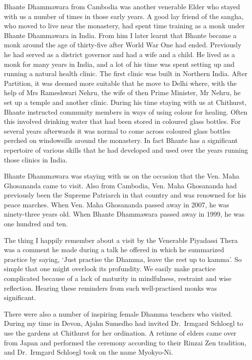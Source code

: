 \enlargethispage{\baselineskip}

Bhante Dhammawara\cite{dhammawara} from Cambodia was another venerable Elder who
stayed with us a number of times in those early years. A good lay friend
of the sangha, who moved to live near the monastery, had spent time
training as a monk under Bhante Dhammawara in India. From him I later
learnt that Bhante became a monk around the age of thirty-five after
World War One had ended. Previously he had served as a district governor
and had a wife and a child. He lived as a monk for many years in India,
and a lot of his time was spent setting up and running a natural health
clinic. The first clinic was built in Northern India. After Partition\cite{partition},
it was deemed more suitable that he move to Delhi where, with
the help of Mrs Rameshwari Nehru\cite{nehru}, the wife of then
Prime Minister, Mr Nehru, he set up a temple and another
clinic. During his time staying with us at Chithurst, Bhante instructed
community members in ways of using colour for healing. Often this
involved drinking water that had been stored in coloured glass bottles.
For several years afterwards it was normal to come across coloured glass
bottles perched on windowsills around the monastery. In fact Bhante has
a significant repertoire of various skills that he had developed and
used over the years running those clinics in India.

Bhante Dhammawara was staying with us on the occasion that the
Ven. Maha Ghosananda\cite{ghosananda} came to visit. Also from Cambodia, Ven. Maha
Ghosananda had previously been the Supreme Patriarch in that country and
was renowned for his peace marches. When Ven. Maha Ghosananda passed
away in 2007, he was ninety-three years old. When Bhante Dhammawara
passed away in 1999, he was one hundred and ten.

The thing I happily remember about a visit by the Venerable Piyadassi Thera was
a comment he made during a talk he offered in which he summarized
practice by saying, `Just practise the Dhamma, leave the rest up to
kamma'. So simple that one might overlook its profundity. We easily make
practice complicated because of a lack of maturity in mindfulness,
restraint and wise reflection. Hearing these reminders from such
well-practised monks was significant.

There were also a number of inspiring female Dhamma teachers who
visited. During my time in Devon, Ajahn Sumedho had invited Dr.~Irmgard
Schloegl to use the gardens at Chithurst for her ordination. A retinue
of elders came over from Japan and performed the ceremony according to
their Rinzai Zen tradition, and Dr.~Irmgard Schloegl took on the name
Myokyo-Ni.


